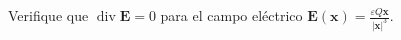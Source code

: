 \item Verifique que $\operatorname{div} \mathbf{E} = 0$ para el campo eléctrico $\mathbf{E}(\mathbf{x}) = \frac{\varepsilon Q \mathbf{x}}{|\mathbf{x}|^3}$.
